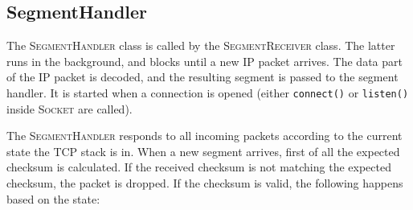 \documentclass{hitec}
\newcommand{\classname}[1]{\textsc{#1}}
\newcommand{\methodname}[1]{\texttt{#1}}
\begin{document}
\subsection{SegmentHandler}
The \classname{SegmentHandler} class is called by the \classname{SegmentReceiver} class. The latter runs in the background, and blocks until a new IP packet arrives. The data part of the IP packet is decoded, and the resulting segment is passed to the segment handler. It is started when a connection is opened (either \methodname{connect()} or \methodname{listen()} inside \classname{Socket} are called). 

The \classname{SegmentHandler} responds to all incoming packets according to the current state the TCP stack is in. When a new segment arrives, first of all the expected checksum is calculated. If the received checksum is not matching the expected checksum, the packet is dropped. If the checksum is valid, the following happens based on the state:
\end{document}
